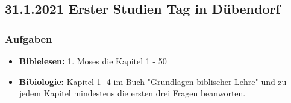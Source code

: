 \subsection{31.1.2021 Erster Studien Tag in Dübendorf}
\subsubsection{Aufgaben}
\begin{itemize}
    \item \textbf{Biblelesen:} 1. Moses die Kapitel 1 - 50
    \item \textbf{Bibiologie:} Kapitel 1 -4 im Buch "Grundlagen biblischer Lehre" \cite{biblischelehre} und zu jedem Kapitel mindestens die ersten drei Fragen beanworten. 
\end{itemize}